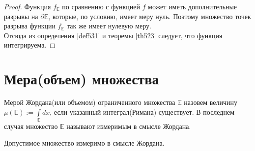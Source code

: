 \begin{proof}
  Функция $f_{\mathbb{E}}$ по сравнению с функцией $f$ может иметь
  дополнительные разрывы на $\partial \mathbb{E}$, которые, по условию, имеет
  меру нуль. Поэтому множество точек разрыва функции $f_{\mathbb{E}}$ так же
  имеет нулевую меру. \\
  Отсюда из определения \eqref{def531} и теоремы \eqref{th523} следует, что
  функция интегрируема.
\end{proof}

\section{Мера(объем) множества}
\begin{definition}
  Мерой Жордана(или объемом) ограниченного множества $\mathbb{E}$ назовем
  величину $\mu(\mathbb{E}) := \int\limits_{\mathbb{E}} dx$, если указанный
  интеграл(Римана) существует. В последнем случая множество $\mathbb{E}$
  называют измеримым в смысле Жордана.
\end{definition}

\begin{theorem}
  Допустимое множество измеримо в смысле Жордана.
\end{theorem}

